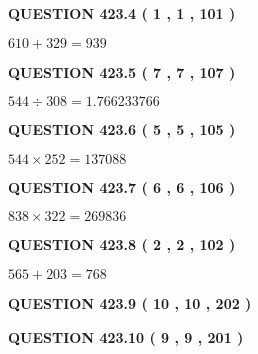 \documentclass{ctexart}
\begin{document}
 
  
\vspace{0.2in}
  
{\textbf{\Large{QUESTION
423.4 
 ( 1 , 1 , 101 )
}}}
  
  
 
 

$ %
610 +  %
329=   %
939$
 
 
  
\vspace{0.2in}
  
{\textbf{\Large{QUESTION
423.5 
 ( 7 , 7 , 107 )
}}}
  
  
 
 

$ %
544 \div  %
308=   %
1.766233766$
 
 
  
\vspace{0.2in}
  
{\textbf{\Large{QUESTION
423.6 
 ( 5 , 5 , 105 )
}}}
  
  
 
 

$ %
544 \times  %
252=   %
137088$
 
 
  
\vspace{0.2in}
  
{\textbf{\Large{QUESTION
423.7 
 ( 6 , 6 , 106 )
}}}
  
  
 
 

$ %
838 \times  %
322=   %
269836$
 
 
  
\vspace{0.2in}
  
{\textbf{\Large{QUESTION
423.8 
 ( 2 , 2 , 102 )
}}}
  
  
 
 

$ %
565 +  %
203=   %
768$
 
 
  
\vspace{0.2in}
  
{\textbf{\Large{QUESTION
423.9 
 ( 10 , 10 , 202 )
}}}
  
  
  
\vspace{0.2in}
  
{\textbf{\Large{QUESTION
423.10 
 ( 9 , 9 , 201 )
}}}
  
  
   
   
 \vspace{0.2in}
 
\end{document}

